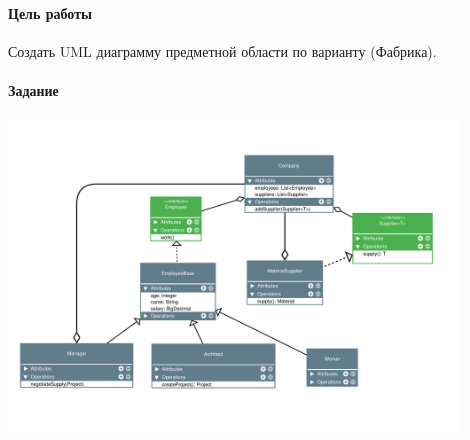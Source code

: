 \paragraph{Цель работы}
Создать UML диаграмму предметной области по варианту (Фабрика).


\paragraph{Задание}
\includegraphics[width=0.9\textwidth]{social-network.pdf}

